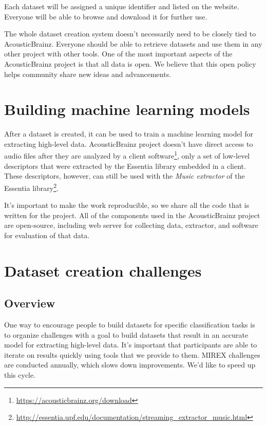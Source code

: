 Each dataset will be assigned a unique identifier and listed on the website. Everyone will be able to browse and download it for further use.

The whole dataset creation system doesn't necessarily need to be closely tied to AcousticBrainz. Everyone should be able to retrieve datasets and use them in any other project with other tools. One of the most important aspects of the AcousticBrainz project is that all data is open. We believe that this open policy helps community share new ideas and advancements.


\section{Building machine learning models}

After a dataset is created, it can be used to train a machine learning model for extracting high-level data. AcousticBrainz project doesn't have direct access to audio files after they are analyzed by a client software\footnote{\url{https://acousticbrainz.org/download}}, only a set of low-level descriptors that were extracted by the Essentia library embedded in a client. These descriptors, however, can still be used with the \textit{Music extractor} of the Essentia library\footnote{\url{http://essentia.upf.edu/documentation/streaming_extractor_music.html}}.

It's important to make the work reproducible, so we share all the code that is written for the project. All of the components used in the AcousticBrainz project are open-source, including web server for collecting data, extractor, and software for evaluation of that data.


\section{Dataset creation challenges}

\subsection{Overview}

One way to encourage people to build datasets for specific classification tasks is to organize challenges with a goal to build datasets that result in an accurate model for extracting high-level data. It's important that participants are able to iterate on results quickly using tools that we provide to them. MIREX challenges are conducted annually, which slows down improvements. We'd like to speed up this cycle.

